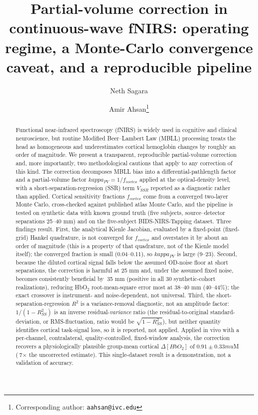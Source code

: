 \documentclass[11pt]{article}
\title{\textbf{Partial-volume correction in continuous-wave fNIRS: operating regime, a Monte-Carlo convergence caveat, and a reproducible pipeline}}
\author[1]{Neth Sagara}
\author[1]{Amir Ahsan\thanks{Corresponding author: \texttt{aahsan@ivc.edu}}}
\affil[1]{Department of Physics, Irvine Valley College, Irvine, CA 92618, USA}
\date{}
\def\kappa{kappa}%
\def\mu{mu}%
\def\sim{~}%
\def\mathrm#1{#1}%
\def\,{ }%
\begin{document}
\maketitle

\begin{abstract}
\noindent Functional near-infrared spectroscopy (fNIRS) is widely used in cognitive and clinical neuroscience, but routine Modified Beer--Lambert Law (MBLL) processing treats the head as homogeneous and underestimates cortical hemoglobin changes by roughly an order of magnitude. We present a transparent, reproducible partial-volume correction and, more importantly, two methodological cautions that apply to any correction of this kind. The correction decomposes MBLL bias into a differential-pathlength factor and a partial-volume factor $\kappa_{\mathrm{PV}}=1/f_{\mathrm{cortex}}$ applied at the optical-density level, with a short-separation-regression (SSR) term $V_{\mathrm{SSR}}$ reported as a diagnostic rather than applied. Cortical sensitivity fractions $f_{\mathrm{cortex}}$ come from a converged two-layer Monte Carlo, cross-checked against published atlas Monte Carlo, and the pipeline is tested on synthetic data with known ground truth (five subjects, source--detector separations 25--40\,mm) and on the five-subject BIDS-NIRS-Tapping dataset. Three findings result. First, the analytical Kienle Jacobian, evaluated by a fixed-point (fixed-grid) Hankel quadrature, is not converged for $f_{\mathrm{cortex}}$ and overstates it by about an order of magnitude (this is a property of that quadrature, not of the Kienle model itself); the converged fraction is small (0.04--0.11), so $\kappa_{\mathrm{PV}}$ is large (9--23). Second, because the diluted cortical signal falls below the assumed OD-noise floor at short separations, the correction is harmful at 25\,mm and, under the assumed fixed noise, becomes consistently beneficial by $\sim$35\,mm (positive in all 30 synthetic-cohort realizations), reducing HbO$_2$ root-mean-square error most at 38--40\,mm (40--44\%); the exact crossover is instrument- and noise-dependent, not universal. Third, the short-separation-regression $R^2$ is a variance-removal diagnostic, not an amplitude factor: $1/(1-R^2_{\mathrm{SS}})$ is an inverse residual-\emph{variance} ratio (the residual-to-original standard-deviation, or RMS-fluctuation, ratio would be $\sqrt{1-R^2_{\mathrm{SS}}}$), but neither quantity identifies cortical task-signal loss, so it is reported, not applied. Applied in vivo with a per-channel, contralateral, quality-controlled, fixed-window analysis, the correction recovers a physiologically plausible group-mean cortical $\Delta[\mathrm{HbO}_2]$ of $0.91\pm0.33\,\mu$M ($\sim$7$\times$ the uncorrected estimate). This single-dataset result is a demonstration, not a validation of accuracy.
\end{abstract}
\end{document}
